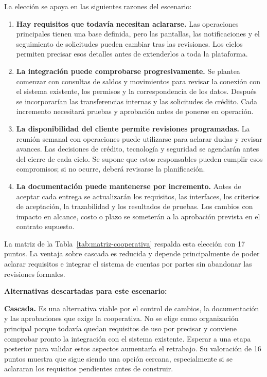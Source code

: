 La elección se apoya en las siguientes razones del escenario:
\begin{enumerate}
    \item \textbf{Hay requisitos que todavía necesitan aclararse.} Las operaciones principales tienen una base definida, pero las pantallas, las notificaciones y el seguimiento de solicitudes pueden cambiar tras las revisiones. Los ciclos permiten precisar esos detalles antes de extenderlos a toda la plataforma.
    \item \textbf{La integración puede comprobarse progresivamente.} Se plantea comenzar con consultas de saldos y movimientos para revisar la conexión con el sistema existente, los permisos y la correspondencia de los datos. Después se incorporarían las transferencias internas y las solicitudes de crédito. Cada incremento necesitará pruebas y aprobación antes de ponerse en operación.
    \item \textbf{La disponibilidad del cliente permite revisiones programadas.} La reunión semanal con operaciones puede utilizarse para aclarar dudas y revisar avances. Las decisiones de crédito, tecnología y seguridad se agendarán antes del cierre de cada ciclo. Se supone que estos responsables pueden cumplir esos compromisos; si no ocurre, deberá revisarse la planificación.
    \item \textbf{La documentación puede mantenerse por incremento.} Antes de aceptar cada entrega se actualizarán los requisitos, las interfaces, los criterios de aceptación, la trazabilidad y los resultados de pruebas. Los cambios con impacto en alcance, costo o plazo se someterán a la aprobación prevista en el contrato supuesto.
\end{enumerate}

La matriz de la Tabla~\ref{tab:matriz-cooperativa} respalda esta elección con 17 puntos. La ventaja sobre cascada es reducida y depende principalmente de poder aclarar requisitos e integrar el sistema de cuentas por partes sin abandonar las revisiones formales.

\textbf{Alternativas descartadas para este escenario:}

\textbf{Cascada.} Es una alternativa viable por el control de cambios, la documentación y las aprobaciones que exige la cooperativa. No se elige como organización principal porque todavía quedan requisitos de uso por precisar y conviene comprobar pronto la integración con el sistema existente. Esperar a una etapa posterior para validar estos aspectos aumentaría el retrabajo. Su valoración de 16 puntos muestra que sigue siendo una opción cercana, especialmente si se aclararan los requisitos pendientes antes de construir.

